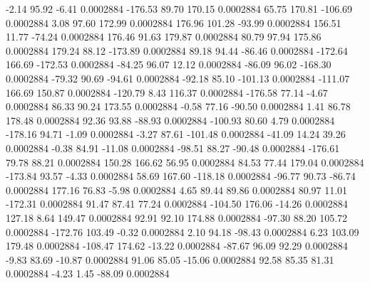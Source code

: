        -2.14       95.92       -6.41     0.0002884
     -176.53       89.70      170.15     0.0002884
       65.75      170.81     -106.69     0.0002884
        3.08       97.60      172.99     0.0002884
      176.96      101.28      -93.99     0.0002884
      156.51       11.77      -74.24     0.0002884
      176.46       91.63      179.87     0.0002884
       80.79       97.94      175.86     0.0002884
      179.24       88.12     -173.89     0.0002884
       89.18       94.44      -86.46     0.0002884
     -172.64      166.69     -172.53     0.0002884
      -84.25       96.07       12.12     0.0002884
      -86.09       96.02     -168.30     0.0002884
      -79.32       90.69      -94.61     0.0002884
      -92.18       85.10     -101.13     0.0002884
     -111.07      166.69      150.87     0.0002884
     -120.79        8.43      116.37     0.0002884
     -176.58       77.14       -4.67     0.0002884
       86.33       90.24      173.55     0.0002884
       -0.58       77.16      -90.50     0.0002884
        1.41       86.78      178.48     0.0002884
       92.36       93.88      -88.93     0.0002884
     -100.93       80.60        4.79     0.0002884
     -178.16       94.71       -1.09     0.0002884
       -3.27       87.61     -101.48     0.0002884
      -41.09       14.24       39.26     0.0002884
       -0.38       84.91      -11.08     0.0002884
      -98.51       88.27      -90.48     0.0002884
     -176.61       79.78       88.21     0.0002884
      150.28      166.62       56.95     0.0002884
       84.53       77.44      179.04     0.0002884
     -173.84       93.57       -4.33     0.0002884
       58.69      167.60     -118.18     0.0002884
      -96.77       90.73      -86.74     0.0002884
      177.16       76.83       -5.98     0.0002884
        4.65       89.44       89.86     0.0002884
       80.97       11.01     -172.31     0.0002884
       91.47       87.41       77.24     0.0002884
     -104.50      176.06      -14.26     0.0002884
      127.18        8.64      149.47     0.0002884
       92.91       92.10      174.88     0.0002884
      -97.30       88.20      105.72     0.0002884
     -172.76      103.49       -0.32     0.0002884
        2.10       94.18      -98.43     0.0002884
        6.23      103.09      179.48     0.0002884
     -108.47      174.62      -13.22     0.0002884
      -87.67       96.09       92.29     0.0002884
       -9.83       83.69      -10.87     0.0002884
       91.06       85.05      -15.06     0.0002884
       92.58       85.35       81.31     0.0002884
       -4.23        1.45      -88.09     0.0002884
